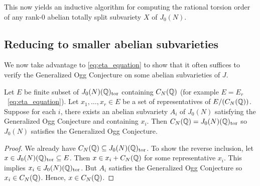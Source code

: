 This now yields an inductive algorithm for computing the rational torsion order
of any rank-0 abelian totally split subvariety $X$ of $J_0(N)$.

\subsection{Reducing to smaller abelian subvarieties}%
\label{sub:reducing_to_smaller_abelian_subvarieties}

We now take advantage to \eqref{eq:eta_equation} to show that it often suffices
to verify the Generalized Ogg Conjecture on some abelian subvarieties of $J$.
\begin{proposition}
    Let $E$ be finite subset of $J_0(N)(\mathbb{Q})_{\mathrm{tor}}$ containing $C_N(\mathbb{Q})$ (for
    example $E=E_r$~\eqref{eq:eta_equation}). Let $x_1,\ldots,x_r\in E$ be a
    set of representatives of $E/(C_N(\mathbb{Q}))$. Suppose for each $i$, there
    exists an abelian subvariety $A_i$ of $J_0(N)$ satisfying the Generalized
    Ogg Conjecture and containing $x_i$. Then $C_N(\mathbb{Q})=J_0(N)(\mathbb{Q})_{\mathrm{tor}}$ so
    $J_0(N)$ satisfies the Generalized Ogg Conjecture.
\end{proposition}
\begin{proof}
    We already have $C_N(\mathbb{Q})\subseteq J_0(N)(\mathbb{Q})_{\mathrm{tor}}$. To show the
    reverse inclusion, let $x\in J_0(N)(\mathbb{Q})_{\mathrm{tor}}\subseteq E$. Then $x\in
    x_i+C_N(\mathbb{Q})$ for some representative $x_i$. This implies $x_i\in
    J_0(N)(\mathbb{Q})_{\mathrm{tor}}$. But $A_i$ satisfies the Generalized Ogg Conjecture so
    $x_i\in C_N(\mathbb{Q})$. Hence, $x\in C_N(\mathbb{Q})$.
\end{proof}





